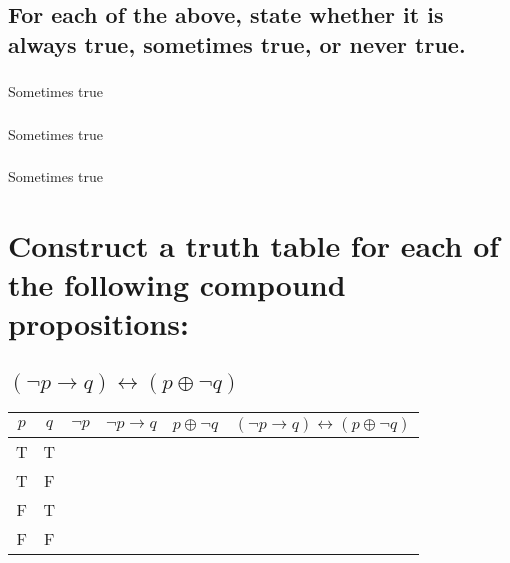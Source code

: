 \documentclass{article}
\begin{document}
    \subsection{For each of the above, state whether it is always true, sometimes true, or never true.} 
        \subsubsection{}Sometimes true
        \subsubsection{}Sometimes true
        \subsubsection{}Sometimes true

\section{Construct a truth table for each of the following compound propositions:}
    \subsection{\texorpdfstring{$(\neg p \to q) \leftrightarrow (p \oplus \neg q)$}{(¬p → q) ↔ (p ⊕ ¬q)}}
        \begin{center}
            \begin{tabular}{|c|c|c|c|c|c|}
                \hline
                $p$ & $q$ & $\neg p$ & $\neg p \to q$ & $p \oplus \neg q$ & $(\neg p \to q) \leftrightarrow (p \oplus \neg q)$ \\
                \hline
                T & T &   &   &   &   \\
                T & F &   &   &   &   \\
                F & T &   &   &   &   \\
                F & F &   &   &   &   \\
                \hline
            \end{tabular}
        \end{center}
        
\end{document}
